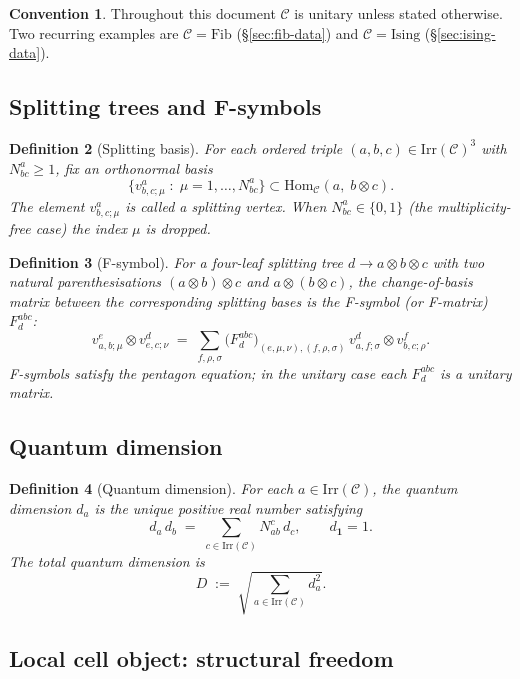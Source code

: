 \documentclass[11pt,a4paper]{article}
\newtheorem{definition}{Definition}[section]
\theoremstyle{definition}
\newtheorem{convention}[definition]{Convention}
\newcommand{\Cc}{\mathcal{C}}
\newcommand{\Irr}{\mathrm{Irr}}
\newcommand{\Hom}{\mathrm{Hom}}
\newcommand{\Fib}{\mathrm{Fib}}
\newcommand{\Ising}{\mathrm{Ising}}
\newcommand{\one}{\mathbf{1}}
\begin{document}
\begin{convention}
Throughout this document $\Cc$ is unitary unless stated otherwise. Two
recurring examples are $\Cc = \Fib$ (\S\ref{sec:fib-data}) and $\Cc = \Ising$
(\S\ref{sec:ising-data}).
\end{convention}

\subsection{Splitting trees and F-symbols}

\begin{definition}[Splitting basis]\label{def:splitbasis}
For each ordered triple $(a,b,c)\in\Irr(\Cc)^3$ with $N_{bc}^{a}\ge 1$,
fix an orthonormal basis
\[
\{ v_{b,c;\mu}^{a} \;:\; \mu = 1,\dots,N_{bc}^{a} \}
\subset \Hom_\Cc(a,\;b\otimes c).
\]
The element $v_{b,c;\mu}^{a}$ is called a \emph{splitting vertex}. When
$N_{bc}^a \in\{0,1\}$ (the multiplicity-free case) the index $\mu$ is dropped.
\end{definition}

\begin{definition}[F-symbol]\label{def:fsymbol}
For a four-leaf splitting tree $d\to a\otimes b\otimes c$ with two natural
parenthesisations $(a\otimes b)\otimes c$ and $a\otimes(b\otimes c)$, the
change-of-basis matrix between the corresponding splitting bases is the
\emph{F-symbol} (or F-matrix) $F^{abc}_d$:
\[
v_{a,b;\mu}^{e}\otimes v_{e,c;\nu}^{d}
\;=\; \sum_{f,\rho,\sigma}
\bigl(F^{abc}_d\bigr)_{(e,\mu,\nu),(f,\rho,\sigma)}\,
v_{a,f;\sigma}^{d}\otimes v_{b,c;\rho}^{f}.
\]
F-symbols satisfy the \emph{pentagon equation}; in the unitary case each
$F^{abc}_d$ is a unitary matrix.
\end{definition}

\subsection{Quantum dimension}

\begin{definition}[Quantum dimension]\label{def:qdim}
For each $a\in\Irr(\Cc)$, the \emph{quantum dimension} $d_a$ is the unique
positive real number satisfying
\[
d_a\,d_b \;=\; \sum_{c\in\Irr(\Cc)} N_{ab}^{c}\, d_c,
\qquad d_\one = 1.
\]
The \emph{total quantum dimension} is
\[
D \;:=\; \sqrt{\sum_{a\in\Irr(\Cc)} d_a^{2}}.
\]
\end{definition}

\subsection{Local cell object: structural freedom}\label{sec:local-cell-object}
\end{document}
